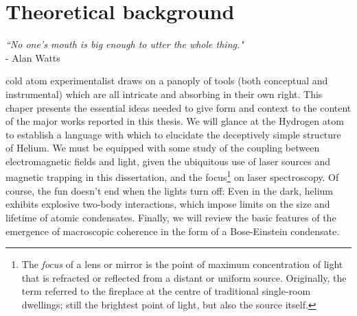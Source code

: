 







\chapter{Theoretical background}
\label{chap:theory}
	\begin{adjustwidth}{0cm}{0cm}
	\begin{flushright}
	\emph{``No one's mouth is big enough to utter the whole thing."\\} 
	- Alan Watts
	\end{flushright}
	\end{adjustwidth}



	 cold atom experimentalist draws on a panoply of tools (both conceptual and instrumental) which are all intricate and absorbing in their own right.
	This chaper presents the essential ideas needed to give form and context to the content of the major works reported in this thesis.
	We will glance at the Hydrogen atom to establish a language with which to elucidate the deceptively simple structure of Helium.
	 We must be equipped with some study of the coupling between electromagnetic fields and light, given the ubiquitous use of laser sources and magnetic trapping in this dissertation, and the focus\footnote{The \emph{focus} of a lens or mirror is the point of maximum concentration of light that is refracted or reflected from a distant or uniform source.
	Originally, the term referred to the fireplace at the centre of traditional single-room dwellings; still the brightest point of light, but also the source itself.} on laser spectroscopy.
	Of course, the fun doesn't end when the lights turn off: Even in the dark, helium exhibits explosive two-body interactions, which impose limits on the size and lifetime of atomic condensates.
	Finally, we will review the basic features of the emergence of macroscopic coherence in the form of a Bose-Einstein condensate.
	
	
